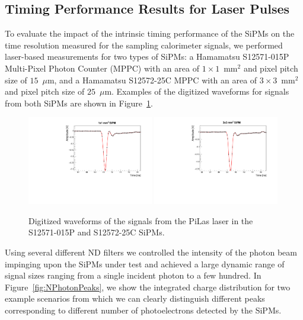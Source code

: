 \subsection{Timing Performance Results for Laser Pulses}
\label{sec:lasertiming}

To evaluate the impact of the intrinsic timing performance of the SiPMs
on the time resolution measured for the sampling calorimeter signals, 
we performed laser-based measurements for two types of SiPMs: a Hamamatsu
S12571-015P Multi-Pixel Photon Counter (MPPC) with an area of $1\times
1$~$\mathrm{mm}^{2}$ and pixel pitch size of $15$~$\mu$m, and a Hamamatsu
S12572-25C MPPC with an area of $3\times 3$~$\mathrm{mm}^{2}$ and pixel pitch
size of $25$~$\mu$m. Examples of the digitized waveforms for signals from both
SiPMs are shown in Figure~\ref{fig:pulses}.

\begin{figure}[htbp] 
\centering
\includegraphics[width=0.49\textwidth]{figures/PulseShapeExample_1x1SiPM.pdf} 
\includegraphics[width=0.49\textwidth]{figures/PulseShapeExample_3x3SiPM.pdf} 
\caption{Digitized waveforms of the signals from the PiLas laser 
in the S12571-015P and S12572-25C SiPMs.} 
\label{fig:pulses} 
\end{figure} 

Using several different ND filters we controlled the intensity of the photon 
beam impinging upon the SiPMs under test and achieved a large dynamic range 
of signal sizes ranging from a single incident photon to a few hundred. In 
Figure~\ref{fig:NPhotonPeaks}, we show the integrated charge distribution
for two example scenarios from which we can clearly distinguish different peaks
corresponding to different number of photoelectrons detected by the SiPMs.

